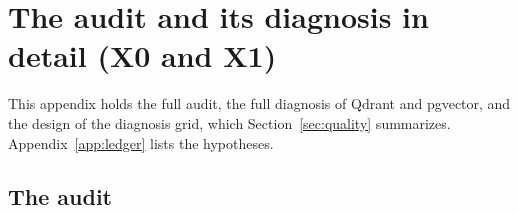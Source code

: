 
\section{The audit and its diagnosis in detail (X0 and X1)}\label{app:quality}

This appendix holds the full audit, the full diagnosis of Qdrant and pgvector, and the design of the diagnosis grid,
which Section~\ref{sec:quality} summarizes. Appendix~\ref{app:ledger} lists the hypotheses.

\subsection{The audit}\label{app:audit}

